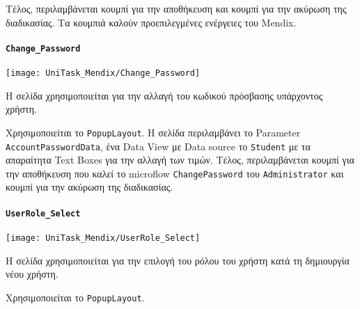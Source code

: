                     Τέλος, περιλαμβάνεται κουμπί για την αποθήκευση και κουμπί για την ακύρωση της διαδικασίας. Τα κουμπιά καλούν προεπιλεγμένες ενέργειες του Mendix.

                \paragraph{\texttt{Change\_Password}}
                    \begin{center}
                        \texttt{[image: UniTask\_Mendix/Change\_Password]}
                    \end{center}

                    Η σελίδα χρησιμοποιείται για την αλλαγή του κωδικού πρόσβασης υπάρχοντος χρήστη.

                    Χρησιμοποιείται το \texttt{PopupLayout}. Η σελίδα περιλαμβάνει το Parameter \linebreak \texttt{AccountPasswordData}, ένα Data View με Data source το \texttt{Student} με τα απαραίτητα Text Boxes για την αλλαγή των τιμών. Τέλος, περιλαμβάνεται κουμπί για την αποθήκευση που καλεί το microflow \texttt{ChangePassword} του \texttt{Administrator} και κουμπί για την ακύρωση της διαδικασίας.

                \paragraph{\texttt{UserRole\_Select}}
                    \begin{center}
                        \texttt{[image: UniTask\_Mendix/UserRole\_Select]}
                    \end{center}

                    Η σελίδα χρησιμοποιείται για την επιλογή του ρόλου του χρήστη κατά τη δημιουργία νέου χρήστη.

                    Χρησιμοποιείται το \texttt{PopupLayout}.